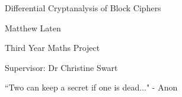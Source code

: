 %

\vspace*{40mm}

\begin{center}

{\LARGE \sc Differential Cryptanalysis of Block Ciphers}

\vspace{20mm}

{\Large Matthew Laten}

\vspace{10mm}

Third Year Maths Project

Supervisor: Dr Christine Swart

\end{center}


\newpage


\vspace*{3cm}

\begin{center}
``Two can keep a secret if one is dead..." - Anon
\begin{comment}
No one has yet discovered any warlike purpose to be served by the
theory of numbers...and it seems very unlikely that anyone will do
so for many years.

G.H. Hardy, 1940.
\end{comment}
\end{center}
